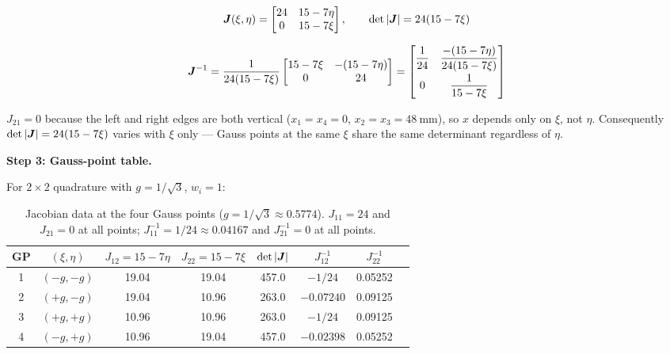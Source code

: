 \begin{example}
\begin{equation}
    \bm{J}(\xi,\eta) =
    \begin{bmatrix} 24 & 15-7\eta \\ 0 & 15-7\xi \end{bmatrix},
    \qquad
    \det|\bm{J}| = 24(15-7\xi)
    \label{eq:jacobian_cook}
\end{equation}

\begin{equation}
    \bm{J}^{-1} =
    \frac{1}{24(15-7\xi)}
    \begin{bmatrix} 15-7\xi & -(15-7\eta) \\ 0 & 24 \end{bmatrix}
    =
    \begin{bmatrix}
        \dfrac{1}{24} & \dfrac{-(15-7\eta)}{24(15-7\xi)} \\[8pt]
        0 & \dfrac{1}{15-7\xi}
    \end{bmatrix}
    \label{eq:Jinv_cook}
\end{equation}

\begin{remark}
$J_{21} = 0$ because the left and right edges are both vertical
($x_1 = x_4 = 0$, $x_2 = x_3 = 48\ \text{mm}$), so $x$ depends only
on $\xi$, not $\eta$. Consequently $\det|\bm{J}| = 24(15-7\xi)$
varies with $\xi$ only --- Gauss points at the same $\xi$ share the
same determinant regardless of $\eta$.
\end{remark}

\medskip
\noindent\textbf{Step 3: Gauss-point table.}

For $2\times2$ quadrature with $g = 1/\sqrt{3}$, $w_i = 1$:

\begin{table}[htbp]
\centering
\small
\caption{Jacobian data at the four Gauss points ($g=1/\sqrt{3}\approx0.5774$).
$J_{11}=24$ and $J_{21}=0$ at all points; $J^{-1}_{11}=1/24\approx0.04167$
and $J^{-1}_{21}=0$ at all points.}
\label{tab:q4_gauss}
\begin{tabular}{@{}cccccccc@{}}
\toprule
GP & $(\xi,\eta)$ & $J_{12}=15{-}7\eta$ & $J_{22}=15{-}7\xi$
   & $\det|\bm{J}|$ & $J^{-1}_{12}$ & $J^{-1}_{22}$ \\
\midrule
1 & $(-g,-g)$ & 19.04 & 19.04 & 457.0 & $-1/24$ & 0.05252 \\
2 & $(+g,-g)$ & 19.04 & 10.96 & 263.0 & $-0.07240$ & 0.09125 \\
3 & $(+g,+g)$ & 10.96 & 10.96 & 263.0 & $-1/24$ & 0.09125 \\
4 & $(-g,+g)$ & 10.96 & 19.04 & 457.0 & $-0.02398$ & 0.05252 \\
\bottomrule
\end{tabular}
\end{table}


\end{example}
